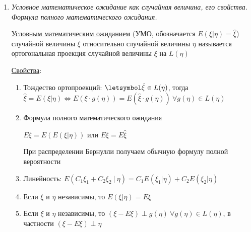 \documentclass[12pt]{article}
\begin{document}
\begin{enumerate}
    \hyperlink{scalarproductoftwovariables}{Скалярным произведением} случайных величин $\xi$ и $\eta$ из $L_2(\Omega, \mathcal{F}, P)$ 
    называется число $(\xi, \eta) = E(\xi\eta)$

    \hyperlink{cauchybunyakovskyschwarzinequality}{Неравенство Коши-Буняковского-Шварца}: \Ths Пусть случайные величины $\xi$ и $\eta$ имеют конечный второй момент, тогда 
    $|E(\xi, \eta)| \leq \sqrt{E\xi^2 \cdot E\eta^2}$ (или $|(\xi, \eta)| \leq \|\xi\|\cdot\|\eta\|$)

    Причем $|E(\xi, \eta)| = \sqrt{E\xi^2 \cdot E\eta^2} \Longleftrightarrow \eta = C\xi$, где $C = \mathrm{const}$

    \item \textit{Условное математическое ожидание как случайная величина, его свойства. Формула полного математического ожидания.}

    \hyperlink{conditionalexpectedvalue}{Условным математическим ожиданием} (УМО, обозначается $E(\xi|\eta) = \hat{\xi}$) случайной величины $\xi$
    относительно случайной величины $\eta$ называется ортогональная проекция случайной величины $\xi$ на $L(\eta)$ 
    
    \hyperlink{conditionalexpectedvalueproperties}{Свойства}:

    \begin{enumerate}
        \item Тождество ортопроекций: $\letsymbol \hat{\xi} \in L(\eta)$, тогда $\hat{\xi} = E(\xi|\eta) \Longleftrightarrow E(\xi\cdot g(\eta)) = E(\hat{\xi}\cdot g(\eta)) \ \forall g(\eta) \in L(\eta)$

        \item Формула полного математического ожидания

        $E\xi = E(E(\xi|\eta))$ или $E\xi = E\hat{\xi}$

        \Nota При распределении Бернулли получаем обычную формулу полной вероятности

        \item Линейность: $E(C_1\xi_1 + C_2\xi_2 \ | \ \eta) = C_1 E(\xi_1|\eta) + C_2 E(\xi_2|\eta)$

        \item Если $\xi$ и $\eta$ независимы, то $E(\xi|\eta) = E\xi$

        \item Если $\xi$ и $\eta$ независимы, то $(\xi - E\xi) \perp g(\eta) \ \forall g(\eta) \in L(\eta)$, 
        в частности $(\xi - E\xi) \perp \eta$
    \end{enumerate}


\end{enumerate}
\end{document}
